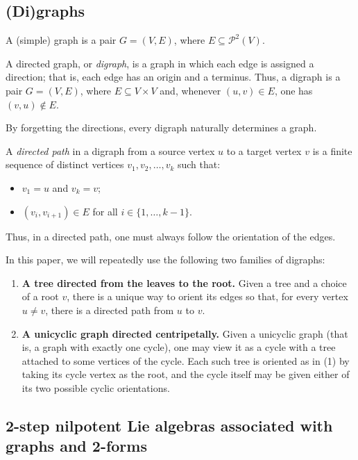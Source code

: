 \documentclass[a4paper,11pt]{amsart}
\theoremstyle{definition}
\theoremstyle{remark}
\numberwithin{equation}{section}
\begin{document}

\subsection{(Di)graphs}\label{subsec:dig}

A (simple) graph is a pair \(G=(V,E)\), where \(E\subseteq \mathcal{P}^2(V)\).

A directed graph, or \emph{digraph}, is a graph in which each edge is assigned a direction; that is, each edge has an origin and a terminus. Thus, a digraph is a pair \(G=(V,E)\), where \(E\subseteq V\times V\) and, whenever \((u,v)\in E\), one has \((v,u)\notin E\).

By forgetting the directions, every digraph naturally determines a graph.

A \emph{directed path} in a digraph from a source vertex $u$ to a target vertex $v$ is a finite sequence of distinct vertices $v_1,v_2,\dots,v_k$ such that:
\begin{itemize}
   \item $v_1=u$ and $v_k=v$;
   \item $(v_i,v_{i+1})\in E$ for all $i\in\{1,\dots,k-1\}$.
\end{itemize}
Thus, in a directed path, one must always follow the orientation of the edges.

In this paper, we will repeatedly use the following two families of digraphs:
\begin{enumerate}
\item \textbf{A tree directed from the leaves to the root.}
Given a tree and a choice of a root \(v\), there is a unique way to orient its edges so that, for every vertex \(u\neq v\), there is a directed path from \(u\) to \(v\).

\item \textbf{A unicyclic graph directed centripetally.}
Given a unicyclic graph (that is, a graph with exactly one cycle), one may view it as a cycle with a tree attached to some vertices of the cycle. 
Each such tree is oriented as in (1) by taking its cycle vertex as the root, and the cycle itself may be given either of its two possible cyclic orientations.
\end{enumerate}



\subsection{2-step nilpotent Lie algebras associated with graphs and 2-forms}
\end{document}
